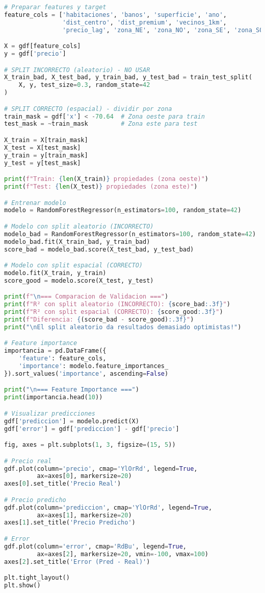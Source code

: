 \documentclass[11pt,a4paper]{article}
\begin{document}
\begin{lstlisting}[language=Python]
# Preparar features y target
feature_cols = ['habitaciones', 'banos', 'superficie', 'ano',
                'dist_centro', 'dist_premium', 'vecinos_1km', 
                'precio_lag', 'zona_NE', 'zona_NO', 'zona_SE', 'zona_SO']

X = gdf[feature_cols]
y = gdf['precio']

# SPLIT INCORRECTO (aleatorio) - NO USAR
X_train_bad, X_test_bad, y_train_bad, y_test_bad = train_test_split(
    X, y, test_size=0.3, random_state=42
)

# SPLIT CORRECTO (espacial) - dividir por zona
train_mask = gdf['x'] < -70.64  # Zona oeste para train
test_mask = ~train_mask         # Zona este para test

X_train = X[train_mask]
X_test = X[test_mask]
y_train = y[train_mask]
y_test = y[test_mask]

print(f"Train: {len(X_train)} propiedades (zona oeste)")
print(f"Test: {len(X_test)} propiedades (zona este)")

# Entrenar modelo
modelo = RandomForestRegressor(n_estimators=100, random_state=42)

# Modelo con split aleatorio (INCORRECTO)
modelo_bad = RandomForestRegressor(n_estimators=100, random_state=42)
modelo_bad.fit(X_train_bad, y_train_bad)
score_bad = modelo_bad.score(X_test_bad, y_test_bad)

# Modelo con split espacial (CORRECTO)
modelo.fit(X_train, y_train)
score_good = modelo.score(X_test, y_test)

print(f"\n=== Comparacion de Validacion ===")
print(f"R² con split aleatorio (INCORRECTO): {score_bad:.3f}")
print(f"R² con split espacial (CORRECTO): {score_good:.3f}")
print(f"Diferencia: {(score_bad - score_good):.3f}")
print("\nEl split aleatorio da resultados demasiado optimistas!")

# Feature importance
importancia = pd.DataFrame({
    'feature': feature_cols,
    'importance': modelo.feature_importances_
}).sort_values('importance', ascending=False)

print("\n=== Feature Importance ===")
print(importancia.head(10))

# Visualizar predicciones
gdf['prediccion'] = modelo.predict(X)
gdf['error'] = gdf['prediccion'] - gdf['precio']

fig, axes = plt.subplots(1, 3, figsize=(15, 5))

# Precio real
gdf.plot(column='precio', cmap='YlOrRd', legend=True, 
         ax=axes[0], markersize=20)
axes[0].set_title('Precio Real')

# Precio predicho
gdf.plot(column='prediccion', cmap='YlOrRd', legend=True,
         ax=axes[1], markersize=20)
axes[1].set_title('Precio Predicho')

# Error
gdf.plot(column='error', cmap='RdBu', legend=True,
         ax=axes[2], markersize=20, vmin=-100, vmax=100)
axes[2].set_title('Error (Pred - Real)')

plt.tight_layout()
plt.show()
\end{lstlisting}
\end{document}
